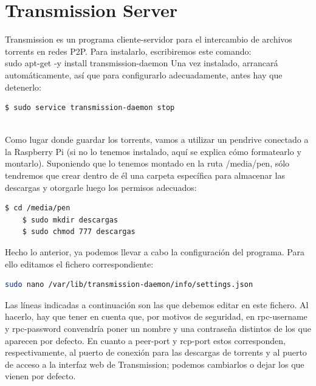 \documentclass{article}
\begin{document}
\section{Transmission Server}
Transmission es un programa cliente-servidor para el intercambio de archivos torrents en redes P2P. Para instalarlo, escribiremos este comando:\\

sudo apt-get -y install transmission-daemon
Una vez instalado, arrancará automáticamente, así que para configurarlo adecuadamente, antes hay que detenerlo:\\

\begin{lstlisting}[language=bash]
    $ sudo service transmission-daemon stop
    
\end{lstlisting}

Como lugar donde guardar los torrents, vamos a utilizar un pendrive conectado a la Raspberry Pi (si no lo tenemos instalado, aquí se explica cómo formatearlo y montarlo). Suponiendo que lo tenemos montado en la ruta /media/pen, sólo tendremos que crear dentro de él una carpeta específica para almacenar las descargas y otorgarle luego los permisos adecuados:

\begin{lstlisting}[language=bash] 
    $ cd /media/pen 
    $ sudo mkdir descargas 
    $ sudo chmod 777 descargas

\end{lstlisting}

Hecho lo anterior, ya podemos llevar a cabo la configuración del programa. Para ello editamos el fichero correspondiente:\\

\begin{lstlisting}[language=bash,caption={bash version}]
sudo nano /var/lib/transmission-daemon/info/settings.json
\end{lstlisting}

Las líneas indicadas a continuación son las que debemos editar en este fichero. Al hacerlo, hay que tener en cuenta que, por motivos de seguridad, en rpc-username y rpc-password convendría poner un nombre y una contraseña distintos de los que aparecen por defecto. En cuanto a peer-port y rcp-port estos corresponden, respectivamente, al puerto de conexión para las descargas de torrents	y al puerto de acceso a la interfaz web de Transmission; podemos cambiarlos	o dejar los que vienen por defecto.\\
\end{document}
